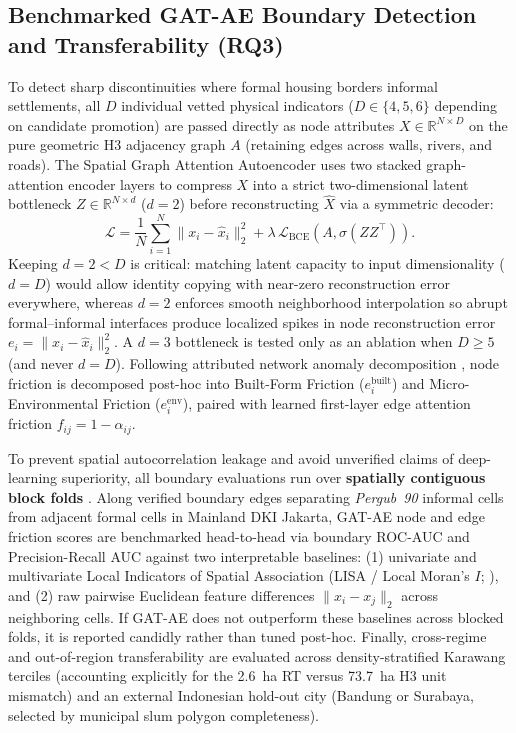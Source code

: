 \subsection{Benchmarked GAT-AE Boundary Detection and Transferability (RQ3)}
To detect sharp discontinuities where formal housing borders informal settlements, all $D$ individual vetted physical indicators ($D \in \{4,5,6\}$ depending on candidate promotion) are passed directly as node attributes $X \in \mathbb{R}^{N \times D}$ on the pure geometric H3 adjacency graph $A$ (retaining edges across walls, rivers, and roads). The Spatial Graph Attention Autoencoder \citep{Salehi2020, Velickovic2018} uses two stacked graph-attention encoder layers to compress $X$ into a strict two-dimensional latent bottleneck $Z \in \mathbb{R}^{N \times d}$ ($d = 2$) before reconstructing $\hat{X}$ via a symmetric decoder:
\begin{equation}
    \mathcal{L} = \frac{1}{N} \sum_{i=1}^{N} \|x_i - \hat{x}_i\|_2^2 + \lambda \, \mathcal{L}_{\text{BCE}}\!\left(A, \sigma(Z Z^\top)\right).
\end{equation}
Keeping $d = 2 < D$ is critical: matching latent capacity to input dimensionality ($d = D$) would allow identity copying with near-zero reconstruction error everywhere, whereas $d = 2$ enforces smooth neighborhood interpolation so abrupt formal--informal interfaces produce localized spikes in node reconstruction error $e_i = \|x_i - \hat{x}_i\|_2^2$. A $d = 3$ bottleneck is tested only as an ablation when $D \ge 5$ (and never $d = D$). Following attributed network anomaly decomposition \citep{Ding2019}, node friction is decomposed post-hoc into Built-Form Friction ($e_i^{\text{built}}$) and Micro-Environmental Friction ($e_i^{\text{env}}$), paired with learned first-layer edge attention friction $f_{ij} = 1 - \alpha_{ij}$.

To prevent spatial autocorrelation leakage and avoid unverified claims of deep-learning superiority, all boundary evaluations run over \textbf{spatially contiguous block folds} \citep{Roberts2017}. Along verified boundary edges separating \textit{Pergub~90} informal cells from adjacent formal cells in Mainland DKI Jakarta, GAT-AE node and edge friction scores are benchmarked head-to-head via boundary ROC-AUC and Precision-Recall AUC against two interpretable baselines: (1) univariate and multivariate Local Indicators of Spatial Association (LISA / Local Moran's $I$; \citealt{Anselin1995}), and (2) raw pairwise Euclidean feature differences $\|x_i - x_j\|_2$ across neighboring cells. If GAT-AE does not outperform these baselines across blocked folds, it is reported candidly rather than tuned post-hoc. Finally, cross-regime and out-of-region transferability are evaluated across density-stratified Karawang terciles (accounting explicitly for the 2.6~ha RT versus 73.7~ha H3 unit mismatch) and an external Indonesian hold-out city (Bandung or Surabaya, selected by municipal slum polygon completeness).
